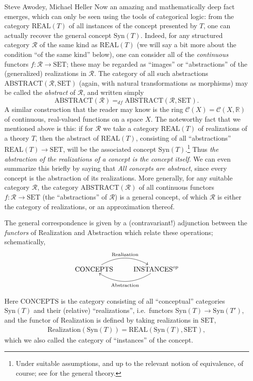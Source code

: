 \begin{artengenv2auth}{Steve Awodey, Michael Heller}
Now an amazing and mathematically deep fact emerges, which can only be seen using the tools of categorical logic: from the category  $\mathrm{REAL}(T) $ of all instances of the concept presented by $T$, one can actually recover the general concept $\mathrm{Syn}(T)$.  Indeed, for any structured category $\mathcal{R}$ of the same kind as $\mathrm{REAL}(T)$ (we will say a bit more about the condition ``of the same kind'' below), one can consider all of the \emph{continuous} functors $f : \mathcal{R} \to \mathrm{SET}$; these may be regarded as ``images'' or ``abstractions'' of the (generalized) realizations in $\mathcal{R}$.  The category of all such abstractions $\mathrm{ABSTRACT}(\mathcal{R}, \mathrm{SET})$ (again, with natural transformations as morphisms) may be called the \emph{abstract} of $\mathcal{R}$, and written simply 
$$
\mathrm{ABSTRACT}(\mathcal{R}) =_{df}  \mathrm{ABSTRACT}(\mathcal{R}, \mathrm{SET}).
$$
A similar construction that the reader may know is the ring $\mathcal{C}(X) = \mathcal{C}(X, \mathbb{R})$ of continuous, real-valued functions on a space $X$. The noteworthy fact that we mentioned above is this: if for $\mathcal{R}$ we take a category $\mathrm{REAL}(T) $ of realizations of a theory $T$, then the abstract of $\mathrm{REAL}(T) $, consisting of all ``abstractions'' $\mathrm{REAL}(T) \to \mathrm{SET}$, will be the associated concept $\mathrm{Syn}(T)$.\footnote{Under suitable assumptions, and up to the relevant notion of equivalence, of course; see \parencite{Awodey2019} for the general theory.}   Thus \emph{the abstraction of the realizations of a concept is the concept itself}.  We can even summarize this briefly by saying that \emph{All concepts are abstract}, since every concept is the abstraction of its realizations.  More generally, for any suitable category $\mathcal{R}$, the category $\mathrm{ABSTRACT}(\mathcal{R})$ of all continuous functors $f : \mathcal{R} \to \mathrm{SET}$ (the ``abstractions'' of $\mathcal{R}$) is a general concept, of which $\mathcal{R}$ is either the category of realizations, or an approximation thereof.  

The general correspondence is given by a (contravariant!) adjunction between the \emph{functors} of Realization and Abstraction which relate these operations; schematically,
\[
\xymatrix{
\mathrm{CONCEPTS}  \ar@/^4ex/ [r]^{\mathrm{Realization}} & \ar@/^4ex/ [l]^{\mathrm{Abstraction}} \mathrm{INSTANCES}^{op}
}
\]

Here $\mathrm{CONCEPTS}$ is the category consisting of all ``conceptual'' categories $\mathrm{Syn}(T)$ and their (relative) ``realizations'', i.e.\ functors  $\mathrm{Syn}(T) \to \mathrm{Syn}(T')$, and the functor of Realization is defined by taking realizations in $\mathrm{SET}$,
\begin{align*}
\mathrm{Realization}(\mathrm{Syn}(T)) = \mathrm{REAL}(\mathrm{Syn}(T), \mathrm{SET}),
\end{align*}
which we also called the category of ``instances'' of the concept. 


\end{artengenv2auth}
